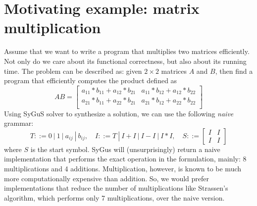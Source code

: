 \section{Motivating example: matrix multiplication}
\label{sec:example}

Assume that we want to write a program that multiplies two matrices efficiently. 
%
Not only do we care about its functional correctness, but also about its running time.
%
The problem can be described as: given $2 \times 2$ matrices $A$ and $B$, then find a program that efficiently computes the product defined as
%
\begin{equation}
    AB =
\begin{bmatrix}
a_{11} * b_{11} + a_{12} * b_{21} &
a_{11} * b_{12} + a_{12} * b_{22} \\
a_{21} * b_{11} + a_{22} * b_{21} &
a_{21} * b_{12} + a_{22} * b_{22} \\
\end{bmatrix}
\label{eqn:matrix-mul}
\end{equation}
%
%
Using SyGuS solver to synthesize a solution, we can use the following \emph{naive} grammar:
%
\[
T ::= 0 \ | \ 1 \ | \ a_{ij} \ | \ b_{ij}, \quad
I ::= T \ | \ I + I \ | \ I - I \ | \ I * I, \quad
S ::=
\begin{bmatrix} I & I \\
I & I
\end{bmatrix}
\]
%
where $S$ is the start symbol. 
%
SyGus will (unsurprisingly) return a naive implementation that performs the exact operation in the formulation, mainly: 8 multiplications and 4 additions.
%
Multiplication, however, is known to be much more computationally expensive than addition.
%
So, we would prefer implementations that reduce the number of multiplications like Strassen's algorithm, which performs only 7 multiplications, over the naive version.
%
